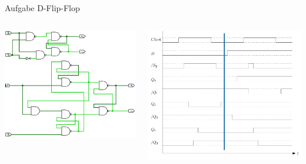 \begin{frame}{Aufgabe \thesection}{D-Flip-Flop}
  \begin{solutionnoinc}
    \begin{columns}
      \begin{column}{0.5\textwidth}
        \includegraphics[height=0.5\paperheight, center]{./figures/comparison000.png}
      \end{column}
      \begin{column}{0.5\textwidth}
        \includegraphics[height=0.5\paperheight, center]{./figures/timing_diagram_3.png}
      \end{column}
    \end{columns}
  \end{solutionnoinc}
\end{frame}
